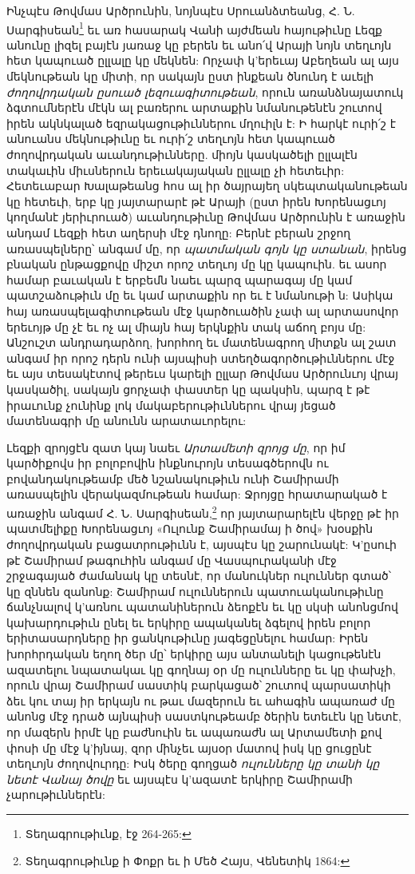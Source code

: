 \documentclass{article}
\begin{document}
{Ինչպէս Թովմաս Արծրունին, նոյնպէս Սրուանձտեանց, Հ. Ն. Սարգիսեան\footnote{Տեղագրութիւնք, էջ 264-265:} եւ առ հասարակ Վանի այժմեան հայութիւնը Լեզք անունը լիզել բայէն յառաջ կը բերեն եւ անո՛վ Արայի նոյն տեղւոյն հետ կապուած ըլլալը կը մեկնեն: Որչափ կ'երեւայ Աբեղեան ալ այս մեկնութեան կը միտի, որ սակայն ըստ ինքեան ծնունդ է աւելի \emph{ժողովրդական ըսուած լեզուագիտութեան}, որուն առանձնայատուկ ձգտումներէն մէկն ալ բառերու արտաքին նմանութենէն շուտով իրեն ակնկալած եզրակացութիւններու մղուիլն է: Ի հարկէ ուրի՛շ է անուանս մեկնութիւնը եւ ուրի՛շ տեղւոյն հետ կապուած ժողովրդական աւանդութիւնները. միոյն կասկածելի ըլլալէն տակաւին միւսներուն երեւակայական ըլլալը չի հետեւիր: Հետեւաբար Խալաթեանց հոս ալ իր ծայրայեղ սկեպտականութեան կը հետեւի, երբ կը յայտարարէ թէ Արայի (ըստ իրեն Խորենացւոյ կողմանէ յերիւրուած) աւանդութիւնը Թովմաս Արծրունին է առաջին անդամ Լեզքի հետ աղերսի մէջ դնողը: Բերնէ բերան շրջող առասպելները՝ անգամ մը, որ \emph{պատմական գոյն կը ստանան}, իրենց բնական ընթացքովը միշտ որոշ տեղւոյ մը կը կապուին. եւ ասոր համար բաւական է երբեմն նաեւ պարզ պարագայ մը կամ պատշաձութիւն մը եւ կամ արտաքին որ եւ է նմանութի ն: Ասիկա հայ առասպելագիտութեան մէջ կարծուածին չափ ալ արտասովոր երեւոյթ մը չէ եւ ոչ ալ միայն հայ երկնքին տակ աճող բոյս մը: Անշուշտ անդրադարձող, խորհող եւ մատենագրող միտքն ալ շատ անգամ իր որոշ դերն ունի այսպիսի ստեղծագործութիւններու մէջ եւ այս տեսակէտով թերեւս կարելի ըլլար Թովմաս Արծրունւոյ վրայ կասկածիլ, սակայն ցորչափ փաստեր կը պակսին, պարզ է թէ իրաւունք չունինք լոկ մակաբերութիւններու վրայ յեցած մատենագրի մը անունն արատաւորելու:

Լեզքի զրոյցէն զատ կայ նաեւ \emph{Արտամետի զրոյց մը}, որ իմ կարծիքովս իր բոլոբովին ինքնուրոյն տեսագծերովն ու բովանդակութեամբ մեծ նշանակութիւն ունի Շամիրամի առասպելին վերակազմութեան համար: Ջրոյցը հրատարակած է առաջին անգամ Հ. Ն. Սարգիսեան,\footnote{Տեղագրութիւնք ի Փոքր եւ ի Մեծ Հայս, Վենետիկ 1864:} որ յայտարարելէն վերջը թէ իր պատմելիքը Խորենացւոյ «Ուլունք Շամիրամայ ի ծով» խօսքին ժողովրդական բացատրութիւնն է, այսպէս կը շարունակէ: Կ'ըսուի թէ Շամիրամ թագուհին անգամ մը Վասպուրականի մէջ շրջագայած ժամանակ կը տեսնէ, որ մանուկներ ուլուններ գտած՝ կը զննեն զանոնք: Շամիրամ ուլուններուն պատուականութիւնը ճանչնալով կ'առնու պատանիներուն ձեոքէն եւ կը սկսի անոնցմով կախարդութիւն ընել եւ երկիրը ապականել ձգելով իրեն բոլոր երիտասարդները իր ցանկութիւնը յագեցընելու համար: Իրեն խորհրդական եղող ծեր մը՝ երկիրը այս անտանելի կացութենէն ազատելու նպատակաւ կը գողնայ օր մը ուլունները եւ կը փախչի, որուն վրայ Շամիրամ սաստիկ բարկացած՝ շուտով պարսատիկի ձեւ կու տայ իր երկայն ու թաւ մազերուն եւ ահագին ապառաժ մը անոնց մէջ դրած այնպիսի սաստկութեամբ ծերին ետեւէն կը նետէ, որ մազերն իրմէ կը բաժնուին եւ ապառաժն ալ Արտամետի քով փոսի մը մէջ կ'իյնայ, զոր մինչեւ այսօր մատով իսկ կը ցուցընէ տեղւոյն ժողովուրդը: Իսկ ծերը գողցած \emph{ուլունները կը տանի կը նետէ Վանայ ծովը} եւ այսպէս կ'ազատէ երկիրը Շամիրամի չարութիւններէն:

}
\end{document}
